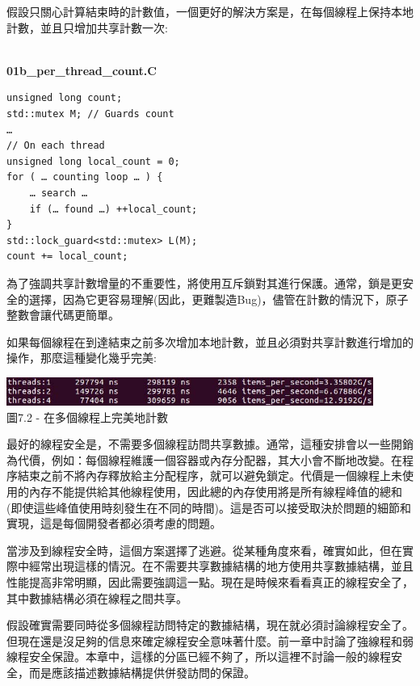假設只關心計算結束時的計數值，一個更好的解決方案是，在每個線程上保持本地計數，並且只增加共享計數一次:

\hspace*{\fill} \\ %
\noindent
\textbf{01b\_per\_thread\_count.C}
\begin{lstlisting}[style=styleCXX]
unsigned long count;
std::mutex M; // Guards count
…
// On each thread
unsigned long local_count = 0;
for ( … counting loop … ) {
	… search …
	if (… found …) ++local_count;
}
std::lock_guard<std::mutex> L(M);
count += local_count;
\end{lstlisting}

為了強調共享計數增量的不重要性，將使用互斥鎖對其進行保護。通常，鎖是更安全的選擇，因為它更容易理解(因此，更難製造Bug)，儘管在計數的情況下，原子整數會讓代碼更簡單。

如果每個線程在到達結束之前多次增加本地計數，並且必須對共享計數進行增加的操作，那麼這種變化幾乎完美:

\begin{center}
\includegraphics[width=0.9\textwidth]{content/2/chapter7/images/2.jpg}\\
圖7.2 - 在多個線程上完美地計數
\end{center}

最好的線程安全是，不需要多個線程訪問共享數據。通常，這種安排會以一些開銷為代價，例如：每個線程維護一個容器或內存分配器，其大小會不斷地改變。在程序結束之前不將內存釋放給主分配程序，就可以避免鎖定。代價是一個線程上未使用的內存不能提供給其他線程使用，因此總的內存使用將是所有線程峰值的總和(即使這些峰值使用時刻發生在不同的時間)。這是否可以接受取決於問題的細節和實現，這是每個開發者都必須考慮的問題。

當涉及到線程安全時，這個方案選擇了逃避。從某種角度來看，確實如此，但在實際中經常出現這樣的情況。在不需要共享數據結構的地方使用共享數據結構，並且性能提高非常明顯，因此需要強調這一點。現在是時候來看看真正的線程安全了，其中數據結構必須在線程之間共享。


假設確實需要同時從多個線程訪問特定的數據結構，現在就必須討論線程安全了。但現在還是沒足夠的信息來確定線程安全意味著什麼。前一章中討論了強線程和弱線程安全保證。本章中，這樣的分區已經不夠了，所以這裡不討論一般的線程安全，而是應該描述數據結構提供併發訪問的保證。

